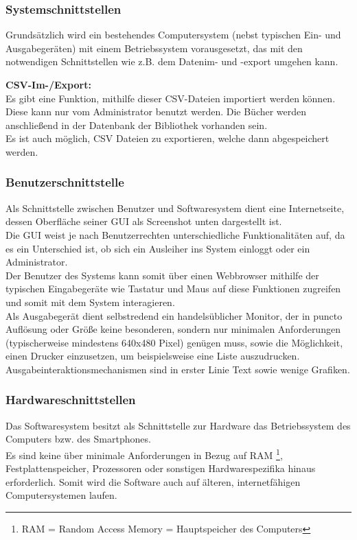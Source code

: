 \documentclass[fontsize=12pt,paper=a4,twoside]{scrartcl}
\begin{document}
\subsubsection{Systemschnittstellen}


  Grundsätzlich wird ein bestehendes Computersystem (nebst typischen Ein- und Ausgabegeräten) 
  mit einem Betriebssystem vorausgesetzt, das mit den notwendigen Schnittstellen wie z.B. dem 
  Datenim- und -export umgehen kann.
  
  \textbf{CSV-Im-/Export:}\\
  Es gibt eine Funktion, mithilfe dieser CSV-Dateien importiert werden können. Diese kann nur vom 
  Administrator benutzt werden. Die Bücher werden anschließend in der Datenbank der Bibliothek 
  vorhanden sein. \\
  Es ist auch möglich, CSV Dateien zu exportieren, welche dann abgespeichert werden.

\subsubsection{Benutzerschnittstelle}

Als Schnittstelle zwischen Benutzer und Softwaresystem dient eine Internetseite, dessen Oberfläche 
seiner GUI als Screenshot unten dargestellt ist. \\
Die GUI weist je nach Benutzerrechten unterschiedliche Funktionalitäten auf, da es ein Unterschied ist, 
ob sich ein Ausleiher ins System einloggt oder ein Administrator. \\
Der Benutzer des Systems kann somit über einen Webbrowser mithilfe der typischen Eingabegeräte wie 
Tastatur und Maus auf diese Funktionen zugreifen und somit mit dem System interagieren. \\
Als Ausgabegerät dient selbstredend ein handelsüblicher Monitor, der in puncto Auflösung oder Größe 
keine besonderen, sondern nur minimalen Anforderungen (typischerweise mindestens 640x480 Pixel) 
genügen muss, sowie die Möglichkeit, einen Drucker einzusetzen, um beispielsweise eine Liste 
auszudrucken. \\
Ausgabeinteraktionsmechanismen sind in erster Linie Text sowie wenige Grafiken. 

\subsubsection{Hardwareschnittstellen} \label{hardware}
Das Softwaresystem besitzt als Schnittstelle zur Hardware das Betriebssystem des Computers bzw. des 
Smartphones. \\
  Es sind keine über minimale Anforderungen in Bezug auf RAM
  \footnote{RAM = Random Access Memory = Hauptspeicher des Computers}, Festplattenspeicher, 
  Prozessoren oder sonstigen Hardwarespezifika hinaus erforderlich. Somit wird die Software auch auf 
  älteren, internetfähigen Computersystemen laufen. \\
 
\end{document}
